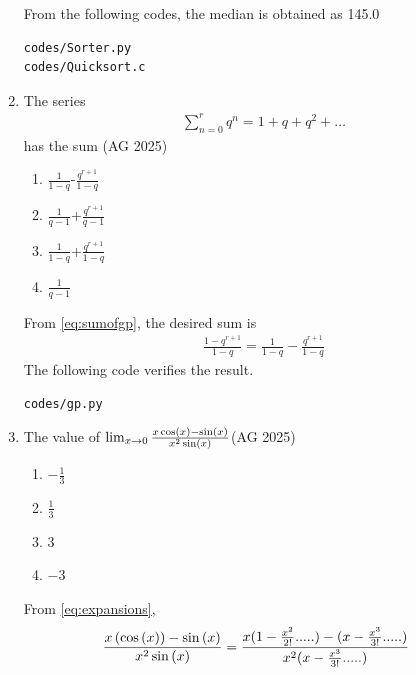 \begin{enumerate}[label=\thesubsection.\arabic*,ref=\thesubsection.\theenumi]
\begin{enumerate}
    \end{enumerate}   
%
\solution
From the  
following codes, the median is obtained as 
145.0
\begin{lstlisting}
codes/Sorter.py
codes/Quicksort.c
\end{lstlisting}
\item The series 
    \begin{align}
\sum_{n=0}^{r} q^n =1+q+q^2+ \dots
\end{align}
 has the sum \hfill(AG 2025)
	\begin{multicols}{4}
    \begin{enumerate}
    \item $\frac{1}{1-q}$-$\frac{q^{r+1}}{1-q}$
    \item $\frac{1}{q-1}$+$\frac{q^{r+1}}{q-1}$
    \item $\frac{1}{1-q}$+$\frac{q^{r+1}}{1-q}$
    \item $\frac{1}{q-1}$
    \end{enumerate}
\end{multicols}
\solution
	From \eqref{eq:sumofgp},
    the desired sum is
    \begin{align}
        \frac{1-q^{r+1}}{1-q}=
        \frac{1}{1-q}-\frac{q^{r+1}}{1-q}        
    \end{align}
The following code verifies the result.
\begin{lstlisting}
codes/gp.py
\end{lstlisting}
\item The value of $\lim_{x\to 0}\frac{x\cos\left(x\right)-\sin\left(x\right)}{x^2\sin\left(x\right)}$\hfill(AG 2025)
	\begin{multicols}{4}
    \begin{enumerate}
        \item $-\frac{1}{3}$
        \item $\frac{1}{3}$
        \item $3$
        \item$-3$
\end{enumerate}
\end{multicols}
        \solution
        From  \eqref{eq:expansions},
       \begin{align}
        \frac{x\brak{\cos\brak{x}}-\sin\brak{x}}{x^2\sin\brak{x}}
        &=\frac{x(1-\frac{x^2}{2!} .....)-(x-\frac{x^3}{3!}.....)}{x^2(x-\frac{x^3}{3!}.....)}

\end{align}
\end{enumerate}
